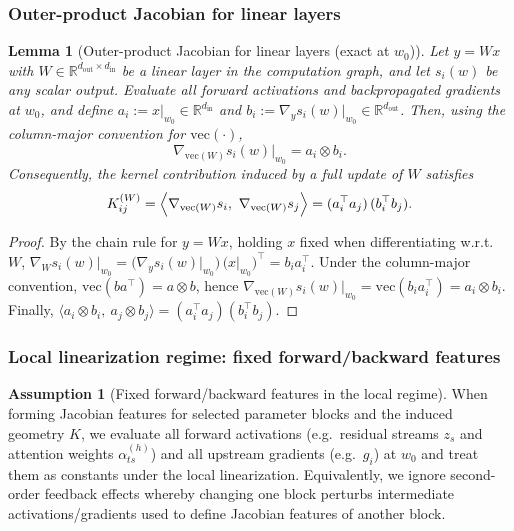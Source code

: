 \documentclass{article}
\theoremstyle{plain}
\newtheorem{lemma}[theorem]{Lemma}
\theoremstyle{definition}
\newtheorem{assumption}[theorem]{Assumption}
\theoremstyle{remark}
\begin{document}
\subsubsection{Outer-product Jacobian for linear layers}
\begin{lemma}[Outer-product Jacobian for linear layers (exact at $w_0$)]
\label{lem:outer_product_jacobian}
Let $y=Wx$ with $W\in\mathbb{R}^{d_{\mathrm{out}}\times d_{\mathrm{in}}}$ be a linear layer in the computation graph,
and let $s_i(w)$ be any scalar output. Evaluate all forward activations and backpropagated gradients at $w_0$, and define $a_i := x\big|_{w_0}\in\mathbb{R}^{d_{\mathrm{in}}}$ and $b_i := \nabla_y s_i(w)\big|_{w_0}\in\mathbb{R}^{d_{\mathrm{out}}}$. Then, using the column-major convention for $\mathrm{vec}(\cdot)$,
\[
\nabla_{\mathrm{vec}(W)} s_i(w)\big|_{w_0} = a_i\otimes b_i.
\]
Consequently, the kernel contribution induced by a full update of $W$ satisfies
\[
K_{ij}^{(W)} =
\Bigl\langle \nabla_{\mathrm{vec}(W)} s_i,\ \nabla_{\mathrm{vec}(W)} s_j\Bigr\rangle
= (a_i^\top a_j)\,(b_i^\top b_j).
\]
\end{lemma}

\begin{proof}
By the chain rule for $y=Wx$, holding $x$ fixed when differentiating w.r.t.\ $W$,
\(
\nabla_W s_i(w)\big|_{w_0} = \bigl(\nabla_y s_i(w)\big|_{w_0}\bigr)\, \bigl(x\big|_{w_0}\bigr)^\top
= b_i a_i^\top.
\)
Under the column-major convention, $\mathrm{vec}(b a^\top)=a\otimes b$, hence
$\nabla_{\mathrm{vec}(W)} s_i(w)\big|_{w_0}=\mathrm{vec}(b_i a_i^\top)=a_i\otimes b_i$.
Finally,
$\langle a_i\otimes b_i,\ a_j\otimes b_j\rangle=(a_i^\top a_j)(b_i^\top b_j)$.
\end{proof}

\subsubsection{Local linearization regime: fixed forward/backward features}
\begin{assumption}[Fixed forward/backward features in the local regime]
\label{assump:frozen_attention}
When forming Jacobian features for selected parameter blocks and the induced geometry $K$, we evaluate all forward activations (e.g.\ residual streams $z_s$ and attention weights $\alpha^{(h)}_{ts}$)
and all upstream gradients (e.g.\ $g_i$) at $w_0$ and treat them as constants under the local linearization.
Equivalently, we ignore second-order feedback effects whereby changing one block perturbs intermediate activations/gradients
used to define Jacobian features of another block.
\end{assumption}
\end{document}
